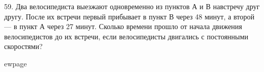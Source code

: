 59. Два велосипедиста выезжают одновременно из пунктов А и В навстречу друг другу. После их встречи первый прибывает в пункт В через 48 минут, а второй --- в пункт А через 27 минут. Сколько времени прошло от начала движения велосипедистов до их встречи, если велосипедисты двигались с постоянными скоростями?

ewpage
